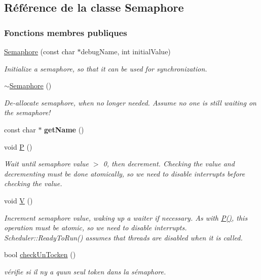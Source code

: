 \hypertarget{class_semaphore}{}\subsection{Référence de la classe Semaphore}
\label{class_semaphore}
\subsubsection*{Fonctions membres publiques}
\begin{DoxyCompactItemize}
\item 
\hyperlink{class_semaphore_a671a20336d97ab712cc84aab3381d34d}{Semaphore} (const char $\ast$debug\+Name, int initial\+Value)
\begin{DoxyCompactList}\small\item\em Initialize a semaphore, so that it can be used for synchronization. \end{DoxyCompactList}\item 
\hypertarget{class_semaphore_a633658a6fde276bffc912028725c6ade}{}\label{class_semaphore_a633658a6fde276bffc912028725c6ade} 
\hyperlink{class_semaphore_a633658a6fde276bffc912028725c6ade}{$\sim$\+Semaphore} ()
\begin{DoxyCompactList}\small\item\em De-\/allocate semaphore, when no longer needed. Assume no one is still waiting on the semaphore! \end{DoxyCompactList}\item 
\hypertarget{class_semaphore_a42700933286df899977950787b46499e}{}\label{class_semaphore_a42700933286df899977950787b46499e} 
const char $\ast$ {\bfseries get\+Name} ()
\item 
void \hyperlink{class_semaphore_a4fee22da0205e3c704b08beaa17e0e7a}{P} ()
\begin{DoxyCompactList}\small\item\em Wait until semaphore value $>$ 0, then decrement. Checking the value and decrementing must be done atomically, so we need to disable interrupts before checking the value. \end{DoxyCompactList}\item 
\hypertarget{class_semaphore_a3e42125b95660ef696d0d0069b804343}{}\label{class_semaphore_a3e42125b95660ef696d0d0069b804343} 
void \hyperlink{class_semaphore_a3e42125b95660ef696d0d0069b804343}{V} ()
\begin{DoxyCompactList}\small\item\em Increment semaphore value, waking up a waiter if necessary. As with \hyperlink{class_semaphore_a4fee22da0205e3c704b08beaa17e0e7a}{P()}, this operation must be atomic, so we need to disable interrupts. Scheduler\+::\+Ready\+To\+Run() assumes that threads are disabled when it is called. \end{DoxyCompactList}\item 
bool \hyperlink{class_semaphore_ab834b59c88a6061633480c6b7adf7f14}{check\+Un\+Tocken} ()
\begin{DoxyCompactList}\small\item\em vérifie si il n\textquotesingle{}y a qu\textquotesingle{}un seul token dans la sémaphore. \end{DoxyCompactList}\end{DoxyCompactItemize}
